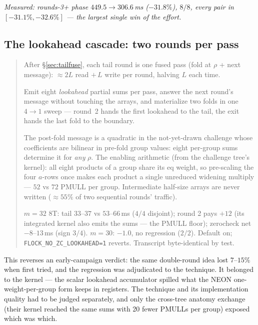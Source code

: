 \documentclass[11pt]{article}
\newcommand{\code}[1]{\texttt{#1}}
\newenvironment{optsummary}{%
  \begin{quote}\small
  \begin{description}
  \setlength{\itemsep}{1pt}\setlength{\parsep}{0pt}\setlength{\topsep}{2pt}
}{%
  \end{description}
  \end{quote}
}
\begin{document}
\emph{Measured: rounds-3+ phase $449.5\to306.6\,$ms ($-31.8\%$), $8/8$,
every pair in $[-31.1\%,-32.6\%]$ --- the largest single win of the effort.}

\subsection{The lookahead cascade: two rounds per pass}
\label{sec:cascade}

\begin{optsummary}
\item[Baseline:] After \S\ref{sec:tailfuse}, each tail round is one fused pass (fold at $\rho$ + next message): $\approx2L$ read $+\,L$ write per round, halving $L$ each time.
\item[Improvement:] Emit eight \emph{lookahead} partial sums per pass, answer the next round's message without touching the arrays, and materialize two folds in one $4{\to}1$ sweep --- round~2 hands the first lookahead to the tail, the exit hands the last fold to the boundary.
\item[Mechanism:] The post-fold message is a quadratic in the not-yet-drawn challenge whose coefficients are bilinear in pre-fold group values: eight per-group sums determine it for \emph{any} $\rho$. The enabling arithmetic (from the challenge tree's kernel): all eight products of a group share its eq weight, so pre-scaling the four $a$-rows once makes each product a single unreduced widening multiply --- $52$ vs $72$ PMULL per group. Intermediate half-size arrays are never written ($\approx55\%$ of two sequential rounds' traffic).
\item[Result:] $m{=}32$ 8T: tail $33$--$37$ vs $53$--$66\,$ms ($4/4$ disjoint); round 2 pays $+12$ (its integrated kernel also emits the sums --- the PMULL floor); zerocheck net $-8$--$13\,$ms (sign $3/4$). $m{=}30$: $-1.0$, no regression ($2/2$). Default on; \code{FLOCK\_NO\_ZC\_LOOKAHEAD=1} reverts. Transcript byte-identical by test.
\end{optsummary}

This reverses an early-campaign verdict: the same double-round idea lost
$7$--$15\%$ when first tried, and the regression was adjudicated to the
technique. It belonged to the kernel --- the scalar lookahead
accumulator spilled what the NEON one-weight-per-group form keeps in
registers. The technique and its implementation quality had to be judged
separately, and only the cross-tree anatomy exchange (their kernel
reached the same sums with 20 fewer PMULLs per group) exposed which was
which.
\end{document}
